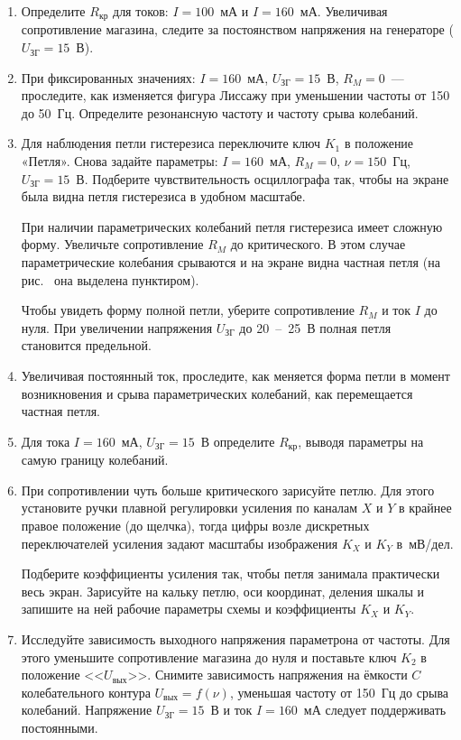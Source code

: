 \begin{lab:task}
\begin{enumerate}
\item
Определите $R_\text{кр}$ для токов: $I = 100$~мА и $I = 160$~мА. Увеличивая сопротивление магазина, следите за постоянством напряжения на генераторе ($U_\text{ЗГ} = 15$~В).

\item
При фиксированных значениях: $I = 160$~мА, $U_\text{ЗГ} = 15$~В, $R_M = 0$~--- проследите, как изменяется фигура Лиссажу при уменьшении частоты от 150 до 50~Гц. Определите резонансную частоту и частоту срыва колебаний.

\item
Для наблюдения петли гистерезиса переключите ключ $K_1$ в положение «Петля». Снова задайте параметры: $I = 160$~мА, $R_M = 0$, $\nu = 150$~Гц, $U_\text{ЗГ} = 15$~В. Подберите чувствительность осциллографа так, чтобы на экране была видна петля гистерезиса в удобном масштабе.

При наличии параметрических колебаний петля гистерезиса имеет сложную форму. Увеличьте сопротивление $R_M$ до критического. В этом случае параметрические колебания срываются и на экране видна частная петля (на рис.~ она выделена пунктиром).

Чтобы увидеть форму полной петли, уберите сопротивление $R_M$ и ток $I$ до нуля. При увеличении напряжения $U_\text{ЗГ}$ до 20~--~25~В полная петля становится предельной.

\item
Увеличивая постоянный ток, проследите, как меняется форма петли в момент возникновения и срыва параметрических колебаний, как перемещается частная петля.

\item
Для тока $I = 160$~мА, $U_\text{ЗГ} = 15$~В определите $R_\text{кр}$, выводя параметры на самую границу колебаний.

\item
При сопротивлении чуть больше критического зарисуйте петлю. Для этого установите ручки плавной регулировки усиления по каналам $X$ и $Y$ в крайнее правое положение (до щелчка), тогда цифры возле дискретных переключателей усиления задают масштабы изображения $K_X$ и $K_Y$ в~мВ/дел.

Подберите коэффициенты усиления так, чтобы петля занимала практически весь экран. Зарисуйте на кальку петлю, оси координат, деления шкалы и запишите на ней рабочие параметры схемы и коэффициенты $K_X$ и $K_Y$.

\item Исследуйте зависимость выходного напряжения параметрона от частоты. Для этого уменьшите сопротивление магазина до нуля и поставьте ключ $K_2$ в положение <<$U_\text{вых}$>>. Снимите зависимость напряжения на ёмкости $C$ колебательного контура $U_\text{вых} = f(\nu)$, уменьшая частоту от 150~Гц до срыва колебаний. Напряжение $U_\text{ЗГ} = 15$~В и ток $I = 160$~мА следует поддерживать постоянными.
\end{enumerate}


\end{lab:task}
